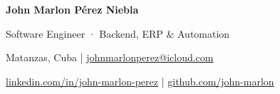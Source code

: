 {\centering
  {\fontsize{23}{26}\selectfont\bfseries John Marlon Pérez Niebla\par}
  \vspace{2pt}
  {\fontsize{11.5}{13.8}\selectfont Software Engineer · Backend, ERP \& Automation\par}
  \vspace{4pt}
  {\normalsize
  Matanzas, Cuba \enspace|\enspace
  \href{mailto:johnmarlonperez@icloud.com}{johnmarlonperez@icloud.com}\par}
  \vspace{2pt}
  {\normalsize
  \href{https://www.linkedin.com/in/john-marlon-perez}{\mbox{linkedin.com/in/john-marlon-perez}} \enspace|\enspace
  \href{https://github.com/john-marlon}{\mbox{github.com/john-marlon}}\par}
}
